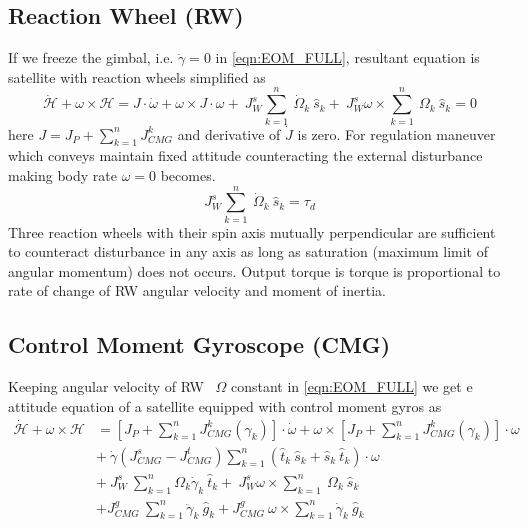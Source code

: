 \subsection{Reaction Wheel (RW)}
If we freeze the gimbal, i.e. $\displaystyle \dot{\gamma } =0$ in \autoref{eqn:EOM_FULL}, resultant equation is satellite with reaction wheels simplified as
\begin{equation}
\dot{\mathcal{H}} +\omega \times \mathcal{H} =J \cdotp \dot{\omega } +\omega \times J \cdotp \omega +\ J^{s}_{W}\sum ^{n}_{k=1} \ \dot{\Omega }_{k} \ \hat{s}_{k} +\ J^{s}_{W} \omega \times \sum ^{n}_{k=1} \ \Omega _{k} \ \hat{s}_{k} =0
\end{equation}
here $\displaystyle J=J_{P} +\sum ^{n}_{k=1} J^{k}_{CMG}$ and derivative of $\displaystyle \dot{J}$ is zero. For regulation maneuver which conveys maintain fixed attitude counteracting the external disturbance making body rate $\displaystyle \omega =0$ becomes.
\begin{equation}
J^{s}_{W}\sum ^{n}_{k=1} \ \dot{\Omega }_{k} \ \hat{s}_{k} =\tau _{d}
\end{equation}
Three reaction wheels with their spin axis mutually perpendicular are sufficient to counteract disturbance in any axis as long as saturation (maximum limit of angular momentum) does not occurs. Output torque is torque is proportional to rate of change of RW angular velocity and moment of inertia.

\subsection{Control Moment Gyroscope (CMG)}
Keeping angular velocity of RW \ $\displaystyle \Omega $ constant in \autoref{eqn:EOM_FULL} we get e attitude equation of a satellite equipped with control moment gyros as 
\begin{equation}
\begin{aligned}
\dot{\mathcal{H}} +\omega \times \mathcal{H} & =\left[ J_{P} +\sum ^{n}_{k=1} J^{k}_{CMG}( \gamma _{k})\right] \cdotp \dot{\omega } +\omega \times \left[ J_{P} +\sum ^{n}_{k=1} J^{k}_{CMG}( \gamma _{k})\right] \cdotp \omega \\
 & +\ \dot{\gamma }\left( J^{s}_{CMG} -J^{t}_{CMG}\right)\sum ^{n}_{k=1}(\hat{t}_{k} \ \hat{s}_{k} +\hat{s}_{k} \ \hat{t}_{k}) \cdotp \omega \\
 & +\ J^{s}_{W} \ \sum ^{n}_{k=1} \Omega _{k}\dot{\gamma }_{k} \ \hat{t}_{k} +\ J^{s}_{W} \omega \times \sum ^{n}_{k=1} \ \Omega _{k} \ \hat{s}_{k}\\
 & +J^{g}_{CMG} \ \sum ^{n}_{k=1}\ddot{\gamma }_{k} \ \hat{g}_{k} +J^{g}_{CMG} \ \omega \times \sum ^{n}_{k=1}\dot{\gamma }_{k} \ \hat{g}_{k}
\end{aligned}
\end{equation}



